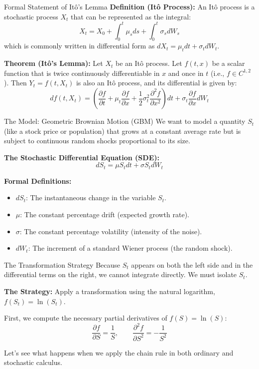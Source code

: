 \documentclass{beamer}
\begin{document}
\begin{frame}{Formal Statement of It\^o's Lemma}
\textbf{Definition (It\^o Process):}
An It\^o process is a stochastic process $X_t$ that can be represented as the integral:
\[ X_t = X_0 + \int_0^t \mu_s ds + \int_0^t \sigma_s dW_s \]
which is commonly written in differential form as $dX_t = \mu_t dt + \sigma_t dW_t$.
\medskip

\textbf{Theorem (It\^o's Lemma):} 
Let $X_t$ be an It\^o process. Let $f(t, x)$ be a scalar function that is twice continuously differentiable in $x$ and once in $t$ (i.e., $f \in C^{1,2}$). Then $Y_t = f(t, X_t)$ is also an It\^o process, and its differential is given by:
\[
df(t, X_t) = \left( \frac{\partial f}{\partial t} + \mu_t \frac{\partial f}{\partial x} + \frac{1}{2}\sigma_t^2 \frac{\partial^2 f}{\partial x^2} \right) dt + \sigma_t \frac{\partial f}{\partial x} dW_t
\]
\medskip
\end{frame}
\begin{frame}{The Model: Geometric Brownian Motion (GBM)}
We want to model a quantity $S_t$ (like a stock price or population) that grows at a constant average rate but is subject to continuous random shocks proportional to its size.

\vspace{0.5cm}
\textbf{The Stochastic Differential Equation (SDE):}
\[ dS_t = \mu S_t dt + \sigma S_t dW_t \]

\textbf{Formal Definitions:}
\begin{itemize}
    \item $dS_t$: The instantaneous change in the variable $S_t$.
    \item $\mu$: The constant percentage drift (expected growth rate).
    \item $\sigma$: The constant percentage volatility (intensity of the noise).
    \item $dW_t$: The increment of a standard Wiener process (the random shock).
\end{itemize}
\end{frame}

\begin{frame}{The Transformation Strategy}
Because $S_t$ appears on both the left side and in the differential terms on the right, we cannot integrate directly. We must isolate $S_t$.

\vspace{0.3cm}
\textbf{The Strategy:} Apply a transformation using the natural logarithm, $f(S_t) = \ln(S_t)$. 

\vspace{0.3cm}
First, we compute the necessary partial derivatives of $f(S) = \ln(S)$:
\[
\frac{\partial f}{\partial S} = \frac{1}{S}, \qquad \frac{\partial^2 f}{\partial S^2} = -\frac{1}{S^2}
\]

\vspace{0.3cm}
Let's see what happens when we apply the chain rule in both ordinary and stochastic calculus.
\end{frame}
\end{document}

